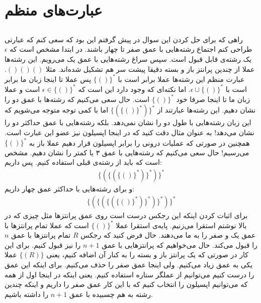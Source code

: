 \section{عبارت‌های منظم}
\subsection{}
راهی که برای حل کردن این سوال در پیش گرفتم این بود که سعی کنم که عبارتی طراحی کنم اجتماع رشته‌هایی با عمق صفر
تا چهار باشند. در ابتدا مشخص است که
$\epsilon$
یک رشته‌ی قابل قبول است. سپس سراغ رشته‌هایی با عمق یک می‌رویم.
این رشته‌ها عملا از چندین پرانتز باز و بسته دقیقا پیشت سر هم تشکیل شده‌اند. مثلا
$()()()$.
عبارت منظم این رشته‌ها عملا برابر است با
$\{()\}^*$
پس عملا تا اینجا زبان ما برابر است با
$\epsilon \cup \{()\}^*$.
اما نکته‌ای که وجود دارد این است که
$\epsilon \in \{()\}^*$
است و عملا زبان ما تا اینجا صرفا خود
$\{()\}^*$
است. حال سعی ‌می‌کنیم که رشته‌ها با عمق دو را نشان دهیم. این رشته‌ها عبارتند از
$\{\left({\{()\}^*}\right)\}^*$
اما با کمی توجه متوجه می‌شویم که این زبان رشته‌هایی با طول دو را نشان نمی‌دهد. بلکه رشته‌هایی با عمق حداکثر
دو را نشان می‌دهد! به عنوان مثال دقت کنید که در اینجا اپسیلون نیز عضو این عبارت است. همچنین در صورتی که
عملیات
درونی را برابر اپسیلون قرار دهیم عملا باز به
$\{()\}^*$
می‌رسیم!
حال سعی می‌کنیم که رشته‌هایی با عمق ۳ یا کمتر را نشان دهیم. مشخص است که باید از رشته‌ی قبلی استفاده کنیم.
پس داریم:
\begin{gather*}
    \{\left({
        \{\left({
            \{()\}^*
        }\right)\}^*
    }\right)\}^*
\end{gather*}
و برای رشته‌هایی با حداکثر عمق چهار داریم:
\begin{gather*}
    \{\left({
        \{\left({
            \{\left({
                \{()\}^*
            }\right)\}^*
        }\right)\}^*
    }\right)\}^*
\end{gather*}
برای اثبات کردن اینکه این رجکس درست است روی عمق پرانتز‌ها مثل چیزی که در بالا نوشتم استقرا می‌زنیم.
پایه‌ی استقرا عملا
$\{()\}^*$
است که عملا تمام پرانتز‌ها با عمق یک و صفر را به ما می‌دهند.
حال فرض کنید که رجکس
$R$
تمام پرانتز‌ها با عمق
$n$
را قبول می‌کند. حال می‌خواهیم که پرانتز‌هایی با عمق
$n+1$
را نیز قبول کنیم. برای این کار در صورتی که یک پرانتز باز و بسته را به کنار آن اضافه کنیم، 
یعنی
$\{(R)\}$
عملا یکی به عمق زیاد می‌کنیم. ولی اینجا عمق صفر را حذف می‌کنیم. برای اینکه این عمق را درست کنیم می‌توانیم
از عملگر ستاره استفاده کنیم. یعنی اینکه در اینجا اول از همه که می‌توانیم اپسیلون را انتخاب
کنیم که با این کار عمق صفر را داریم و اینکه چندین رشته به هم چسبیده با عمق
$n+1$
را داشته باشیم.
